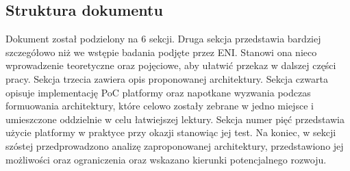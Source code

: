 \subsection{Struktura dokumentu}

Dokument został podzielony na 6 sekcji. Druga sekcja przedstawia bardziej szczegółowo niż we wstępie badania podjęte przez ENI. Stanowi ona nieco wprowadzenie teoretyczne oraz pojęciowe, aby ułatwić przekaz w dalszej części pracy. Sekcja trzecia zawiera opis proponowanej architektury. Sekcja czwarta opisuje implementację PoC platformy oraz napotkane wyzwania podczas formuowania architektury, które celowo zostały zebrane w jedno miejsce i umieszczone oddzielnie w celu łatwiejszej lektury. Sekcja numer pięć przedstawia użycie platformy w praktyce przy okazji stanowiąc jej test. Na koniec, w sekcji szóstej przedprowadzono analizę zaproponowanej architektury, przedstawiono jej możliwości oraz ograniczenia oraz wskazano kierunki potencjalnego rozwoju.